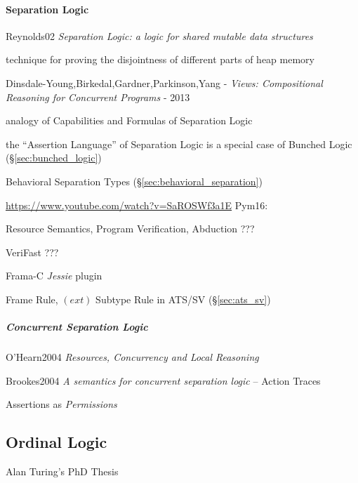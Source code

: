 \paragraph{Separation Logic}\label{sec:separation_logic}\hfill

Reynolds02 \emph{Separation Logic: a logic for shared mutable data
  structures}

technique for proving the disjointness of different parts of heap memory

Dinsdale-Young,Birkedal,Gardner,Parkinson,Yang - \emph{Views: Compositional
Reasoning for Concurrent Programs} - 2013

analogy of Capabilities and Formulas of Separation Logic

the ``Assertion Language'' of Separation Logic is a special case of
Bunched Logic (\S\ref{sec:bunched_logic})


\fist Behavioral Separation Types (\S\ref{sec:behavioral_separation})

\url{https://www.youtube.com/watch?v=SaROSWf3a1E} Pym16:

Resource Semantics, Program Verification, Abduction ???

VeriFast ???

Frama-C \emph{Jessie} plugin

Frame Rule, \fist $(ext)$ Subtype Rule in ATS/SV (\S\ref{sec:ats_sv})



\subparagraph{Concurrent Separation Logic}
\label{sec:concurrent_separation}\hfill

O'Hearn2004 \emph{Resources, Concurrency and Local Reasoning}

Brookes2004 \emph{A semantics for concurrent separation logic} --
Action Traces

Assertions as \emph{Permissions}



\subsection{Ordinal Logic}\label{sec:ordinal_logic}

Alan Turing's PhD Thesis \cite{turing38}



